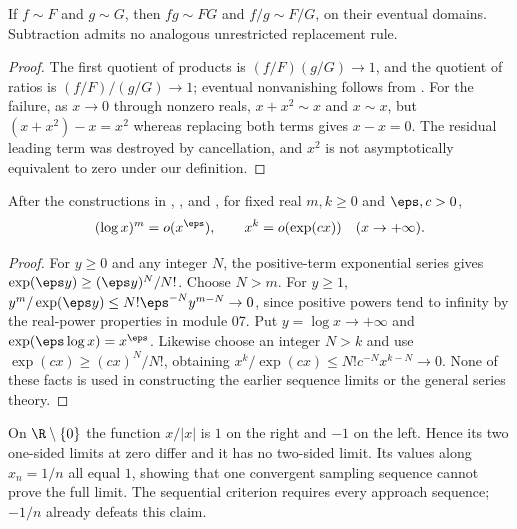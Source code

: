\begin{proposition}
If $f\sim F$ and $g\sim G$, then $fg\sim FG$ and $f/g\sim F/G$, on their eventual domains. Subtraction admits no analogous unrestricted replacement rule.
\end{proposition}
\begin{proof}
The first quotient of products is $(f/F)(g/G)\to1$, and the quotient of ratios is $(f/F)/(g/G)\to1$; eventual nonvanishing follows from . For the failure, as $x\to0$ through nonzero reals, $x+x^2\sim x$ and $x\sim x$, but $(x+x^2)-x=x^2$ whereas replacing both terms gives $x-x=0$. The residual leading term was destroyed by cancellation, and $x^2$ is not asymptotically equivalent to zero under our definition.
\end{proof}

\begin{theorem}
After the constructions in , , and , for fixed real $m,k\ge0$ and $\eps,c>0$,
\[ (\log x)^m=o(x^\eps),\qquad x^k=o(\exp(cx))\quad(x\to+\infty). \]
\end{theorem}
\begin{proof}
For $y\ge0$ and any integer $N$, the positive-term exponential series gives $\exp(\eps y)\ge (\eps y)^N/N!$. Choose $N>m$. For $y\ge1$, $y^m/\exp(\eps y)\le N!\eps^{-N}y^{m-N}\to0$, since positive powers tend to infinity by the real-power properties in module 07. Put $y=\log x\to+\infty$ and $\exp(\eps\log x)=x^\eps$. Likewise choose an integer $N>k$ and use $\exp(cx)\ge(cx)^N/N!$, obtaining $x^k/\exp(cx)\le N!c^{-N}x^{k-N}\to0$. None of these facts is used in constructing the earlier sequence limits or the general series theory.
\end{proof}

\begin{example}
On $\R\setminus\{0\}$ the function $x/|x|$ is $1$ on the right and $-1$ on the left. Hence its two one-sided limits at zero differ and it has no two-sided limit. Its values along $x_n=1/n$ all equal $1$, showing that one convergent sampling sequence cannot prove the full limit. The sequential criterion requires every approach sequence; $-1/n$ already defeats this claim.
\end{example}

